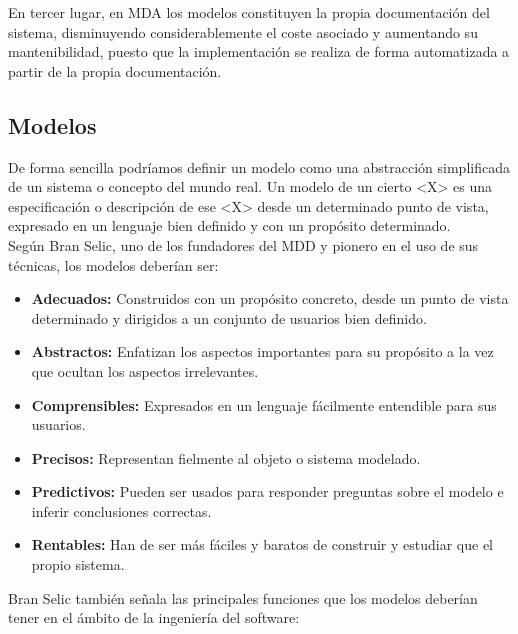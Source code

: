 En tercer lugar, en MDA los modelos constituyen la propia documentación del sistema, disminuyendo considerablemente el coste asociado y aumentando su mantenibilidad, puesto que la implementación se realiza de forma automatizada a partir de la propia documentación.

\subsection{Modelos}
\label{Modelos}

De forma sencilla podríamos definir un modelo como una abstracción simplificada de un sistema o concepto del mundo real. Un modelo de un cierto <X> es una especificación o descripción de ese <X> desde un determinado punto de vista, expresado en un lenguaje bien definido y con un propósito determinado.\\

Según Bran Selic, uno de los fundadores del MDD y pionero en el uso de sus técnicas, los modelos deberían ser:
\begin{itemize}
	\item \textbf{Adecuados:} Construidos con un propósito concreto, desde un punto de vista determinado y dirigidos a un conjunto de usuarios bien definido.
	
	\item \textbf{Abstractos:} Enfatizan los aspectos importantes para su propósito a la vez que ocultan los aspectos irrelevantes.
	
	\item \textbf{Comprensibles:} Expresados en un lenguaje fácilmente entendible para sus usuarios.
	
	\item \textbf{Precisos:} Representan fielmente al objeto o sistema modelado.
	
	\item \textbf{Predictivos:} Pueden ser usados para responder preguntas sobre el modelo e inferir conclusiones correctas.
	
	\item \textbf{Rentables:} Han de ser más fáciles y baratos de construir y estudiar que el propio sistema.
\end{itemize}

Bran Selic también señala las principales funciones que los modelos deberían tener en el ámbito de la ingeniería del software:

